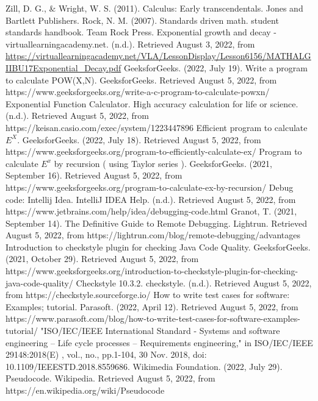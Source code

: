 \documentclass[a4paper,12pt]{report}
\begin{document}
\begin{thebibliography}{9}
 Zill, D. G., \& Wright, W. S. (2011). Calculus: Early transcendentals. Jones and Bartlett Publishers.
 Rock, N. M. (2007). Standards driven math. student standards handbook. Team Rock Press.
Exponential growth and decay - virtuallearningacademy.net. (n.d.). Retrieved August 3, 2022, from  \url{https://virtuallearningacademy.net/VLA/LessonDisplay/Lesson6156/MATHALGIIBU17Exponential_Decay.pdf}
GeeksforGeeks. (2022, July 19). Write a program to calculate POW(X,N). GeeksforGeeks. Retrieved August 5, 2022, from https://www.geeksforgeeks.org/write-a-c-program-to-calculate-powxn/
Exponential Function Calculator. High accuracy calculation for life or science. (n.d.). Retrieved August 5, 2022, from https://keisan.casio.com/exec/system/1223447896
Efficient program to calculate $E^X$. GeeksforGeeks. (2022, July 18). Retrieved August 5, 2022, from https://www.geeksforgeeks.org/program-to-efficiently-calculate-ex/
Program to calculate $E^x$ by recursion ( using Taylor series ). GeeksforGeeks. (2021, September 16). Retrieved August 5, 2022, from https://www.geeksforgeeks.org/program-to-calculate-ex-by-recursion/
Debug code: Intellij Idea. IntelliJ IDEA Help. (n.d.). Retrieved August 5, 2022, from https://www.jetbrains.com/help/idea/debugging-code.html
Granot, T. (2021, September 14). The Definitive Guide to Remote Debugging. Lightrun. Retrieved August 5, 2022, from https://lightrun.com/blog/remote-debugging/advantages
Introduction to checkstyle plugin for checking Java Code Quality. GeeksforGeeks. (2021, October 29). Retrieved August 5, 2022, from https://www.geeksforgeeks.org/introduction-to-checkstyle-plugin-for-checking-java-code-quality/
Checkstyle 10.3.2. checkstyle. (n.d.). Retrieved August 5, 2022, from https://checkstyle.sourceforge.io/
How to write test cases for software: Examples; tutorial. Parasoft. (2022, April 12). Retrieved August 5, 2022, from https://www.parasoft.com/blog/how-to-write-test-cases-for-software-examples-tutorial/
"ISO/IEC/IEEE International Standard - Systems and software engineering -- Life cycle processes -- Requirements engineering," in ISO/IEC/IEEE 29148:2018(E) , vol., no., pp.1-104, 30 Nov. 2018, doi: 10.1109/IEEESTD.2018.8559686.
Wikimedia Foundation. (2022, July 29). Pseudocode. Wikipedia. Retrieved August 5, 2022, from https://en.wikipedia.org/wiki/Pseudocode
\end{thebibliography}
\end{document}
